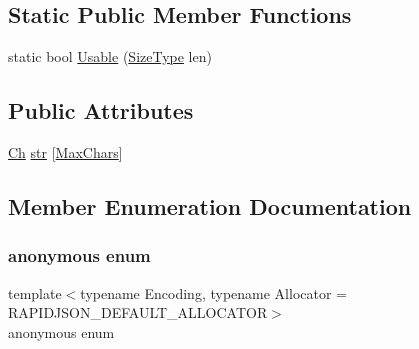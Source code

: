 \subsection*{Static Public Member Functions}
\begin{DoxyCompactItemize}
\item 
static bool \hyperlink{structGenericValue_1_1ShortString_a73e40f625c1abbd84f95ac7fff8365f7}{Usable} (\hyperlink{rapidjson_8h_a5ed6e6e67250fadbd041127e6386dcb5}{Size\+Type} len)
\end{DoxyCompactItemize}
\subsection*{Public Attributes}
\begin{DoxyCompactItemize}
\item 
\hyperlink{classGenericValue_ade0e0ce64ccd5d852da57a35e720bafb}{Ch} \hyperlink{structGenericValue_1_1ShortString_a444e24523d4cc33830d18a2cfcfd333b}{str} \mbox{[}\hyperlink{structGenericValue_1_1ShortString_a04dd81c10335aeb7163fde8fbf5fb383a6b29cffcea816906d271656a958bc0c7}{Max\+Chars}\mbox{]}
\end{DoxyCompactItemize}


\subsection{Member Enumeration Documentation}
\mbox{\label{structGenericValue_1_1ShortString_a04dd81c10335aeb7163fde8fbf5fb383}} 
\subsubsection{\texorpdfstring{anonymous enum}{anonymous enum}}
{\footnotesize\ttfamily template$<$typename Encoding, typename Allocator = R\+A\+P\+I\+D\+J\+S\+O\+N\+\_\+\+D\+E\+F\+A\+U\+L\+T\+\_\+\+A\+L\+L\+O\+C\+A\+T\+OR$>$ \\
anonymous enum}

